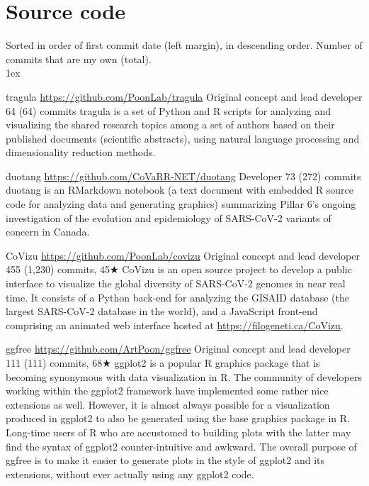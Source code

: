 
\section{Source code}

Sorted in order of first commit date (left margin), in descending order.
Number of commits that are my own (total).\\

\parskip 1ex


{tragula}
{\url{https://github.com/PoonLab/tragula}}
{Original concept and lead developer}
{64 (64) commits}
{tragula is a set of Python and R scripts for analyzing and visualizing the shared research topics among a set of authors based on their published documents (scientific abstracts), using natural language processing and dimensionality reduction methods.}


{duotang}
{\url{https://github.com/CoVaRR-NET/duotang}}
{Developer}
{73 (272) commits}
{duotang is an RMarkdown notebook (a text document with embedded R source code for analyzing data and generating graphics) summarizing Pillar 6's ongoing investigation of the evolution and epidemiology of SARS-CoV-2 variants of concern in Canada.}



{CoVizu}
{\url{https://github.com/PoonLab/covizu}}
{Original concept and lead developer}
{455 (1,230) commits, 45$\bigstar$}
{CoVizu is an open source project to develop a public interface to visualize the global diversity of SARS-CoV-2 genomes in near real time.
It consists of a Python back-end for analyzing the GISAID database (the largest SARS-CoV-2 database in the world), and a JavaScript front-end comprising an animated web interface hosted at \url{https://filogeneti.ca/CoVizu}.}


{ggfree}
{\url{https://github.com/ArtPoon/ggfree}}
{Original concept and lead developer}
{111 (111) commits, 68$\bigstar$}
{ggplot2 is a popular R graphics package that is becoming synonymous with data visualization in R. The community of developers working within the ggplot2 framework have implemented some rather nice extensions as well. However, it is almost always possible for a visualization produced in ggplot2 to also be generated using the base graphics package in R. Long-time users of R who are accustomed to building plots with the latter may find the syntax of ggplot2 counter-intuitive and awkward. The overall purpose of ggfree is to make it easier to generate plots in the style of ggplot2 and its extensions, without ever actually using any ggplot2 code.}


